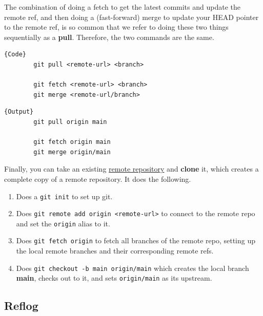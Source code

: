   \begin{definition}[Pull]
    \label{def:pull}
    The combination of doing a fetch to get the latest commits and update the remote ref, and then doing a (fast-forward) merge to update your HEAD pointer to the remote ref, is so common that we refer to doing these two things sequentially as a \textbf{pull}. Therefore, the two commands are the same. 

    \noindent\begin{minipage}{.5\textwidth}
      \begin{lstlisting}[]{Code}
        git pull <remote-url> <branch> 

        git fetch <remote-url> <branch>  
        git merge <remote-url/branch>
      \end{lstlisting}
      \end{minipage}
      \hfill
      \begin{minipage}{.49\textwidth}
      \begin{lstlisting}[]{Output}
        git pull origin main 

        git fetch origin main 
        git merge origin/main
      \end{lstlisting}
    \end{minipage}
  \end{definition}

  \begin{definition}[Clone]
    \label{def:clone}
    Finally, you can take an existing \hyperref[def:remote-repository]{remote repository} and \textbf{clone} it, which creates a complete copy of a remote repository. It does the following. 
    \begin{enumerate}
      \item Does a \texttt{git init} to set up git. 
      \item Does \texttt{git remote add origin <remote-url>} to connect to the remote repo and set the \texttt{origin} alias to it. 
      \item Does \texttt{git fetch origin} to fetch all branches of the remote repo, setting up the local remote branches and their corresponding remote refs. 
      \item Does \texttt{git checkout -b main origin/main} which creates the local branch \textbf{main}, checks out to it, and sets \texttt{origin/main} as its upstream. 
    \end{enumerate}
  \end{definition}

\subsection{Reflog} 


